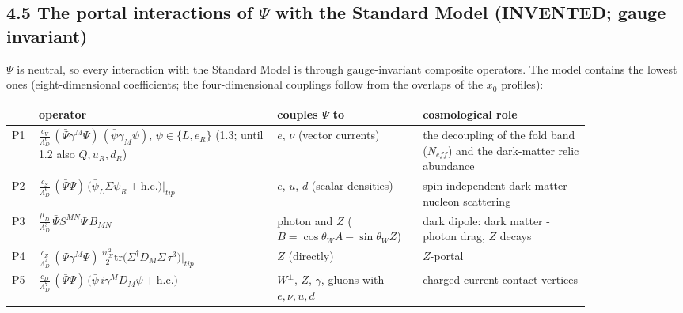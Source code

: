 \documentclass[11pt]{article}
\begin{document}
\subsection*{4.5 The portal interactions of $\Psi$ with the Standard Model (INVENTED; gauge invariant)}

$\Psi$ is neutral, so every interaction with the Standard Model is through gauge-invariant composite operators. The model contains the lowest ones (eight-dimensional coefficients; the four-dimensional couplings follow from the overlaps of the $x_0$ profiles):

\begin{longtable}{>{\raggedright\arraybackslash}p{0.042\linewidth}>{\raggedright\arraybackslash}p{0.378\linewidth}>{\raggedright\arraybackslash}p{0.162\linewidth}>{\raggedright\arraybackslash}p{0.269\linewidth}}
\toprule
\textbf{} & \textbf{operator} & \textbf{couples $\Psi$ to} & \textbf{cosmological role} \\
\midrule
P1 & $\frac{c_V}{\Lambda_D^{6}}\,(\bar\Psi\gamma^M\Psi)\,(\bar\psi\gamma_M\psi)$, $\psi \in \{L, e_R\}$ (1.3; until 1.2 also $Q, u_R, d_R$) & $e$, $\nu$ (vector currents) & the decoupling of the fold band ($N_{eff}$) and the dark-matter relic abundance \\
P2 & $\frac{c_S}{\Lambda_D^{6}}\,(\bar\Psi\Psi)\,\big(\bar\psi_L\Sigma\psi_R + \mathrm{h.c.}\big)\big|_{tip}$ & $e$, $u$, $d$ (scalar densities) & spin-independent dark matter - nucleon scattering \\
P3 & $\frac{\mu_D}{\Lambda_D^{3}}\,\bar\Psi S^{MN}\Psi\, B_{MN}$ & photon and $Z$ ($B = \cos\theta_W A - \sin\theta_W Z$) & dark dipole: dark matter - photon drag, $Z$ decays \\
P4 & $\frac{c_Z}{\Lambda_D^{4}}\,(\bar\Psi\gamma^M\Psi)\,\frac{i v_\Sigma^2}{2}\mathrm{tr}\big(\Sigma^\dagger D_M\Sigma\,\tau^3\big)\big|_{tip}$ & $Z$ (directly) & $Z$-portal \\
P5 & $\frac{c_D}{\Lambda_D^{7}}\,(\bar\Psi\Psi)\,\big(\bar\psi\, i\gamma^M D_M\psi + \mathrm{h.c.}\big)$ & $W^\pm$, $Z$, $\gamma$, gluons with $e, \nu, u, d$ & charged-current contact vertices \\
\bottomrule
\end{longtable}
\end{document}

